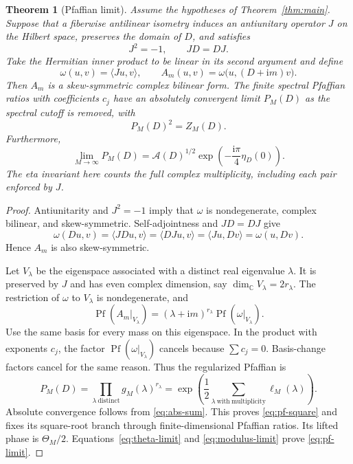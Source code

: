 \documentclass[11pt,a4paper]{article}
\newtheorem{theorem}{Theorem}[section]
\theoremstyle{remark}
\DeclareMathOperator{\Pf}{Pf}
\newcommand{\ii}{\mathrm i}
\newcommand{\C}{\mathbb C}
\numberwithin{equation}{section}
\begin{document}
\begin{theorem}[Pfaffian limit]\label{thm:pf}
Assume the hypotheses of Theorem~\ref{thm:main}. Suppose that a
fiberwise antilinear isometry induces an antiunitary operator $J$ on
the Hilbert space, preserves the domain of $D$, and satisfies
\begin{equation}\label{eq:J}
 J^2=-1,\qquad JD=DJ.
\end{equation}
Take the Hermitian inner product to be linear in its second argument
and define
\begin{equation}\label{eq:omega}
 \omega(u,v)=\langle Ju,v\rangle,
 \qquad A_m(u,v)=\omega\bigl(u,(D+\ii m)v\bigr).
\end{equation}
Then $A_m$ is a skew-symmetric complex bilinear form. The finite
spectral Pfaffian ratios with coefficients $c_j$ have an absolutely
convergent limit $P_M(D)$ as the spectral cutoff is removed, with
\begin{equation}\label{eq:pf-square}
 P_M(D)^2=Z_M(D).
\end{equation}
Furthermore,
\begin{equation}\label{eq:pf-limit}
 \lim_{M\to\infty}P_M(D)
 =\mathcal A(D)^{1/2}
       \exp\!\left(-\frac{\ii\pi}{4}\eta_D(0)\right).
\end{equation}
The eta invariant here counts the full complex multiplicity,
including each pair enforced by $J$.
\end{theorem}

\begin{proof}
Antiunitarity and $J^2=-1$ imply that $\omega$ is nondegenerate,
complex bilinear, and skew-symmetric. Self-adjointness and
$JD=DJ$ give
\begin{equation}\label{eq:omega-D}
 \omega(Du,v)=\langle JDu,v\rangle
 =\langle DJu,v\rangle=\langle Ju,Dv\rangle=\omega(u,Dv).
\end{equation}
Hence $A_m$ is also skew-symmetric.

Let $V_\lambda$ be the eigenspace associated with a distinct real
eigenvalue $\lambda$. It is preserved by $J$ and has even complex
dimension, say $\dim_\C V_\lambda=2r_\lambda$.
The restriction of $\omega$ to $V_\lambda$ is nondegenerate, and
\begin{equation}\label{eq:pf-eigenspace}
 \Pf(A_m|_{V_\lambda})
 =(\lambda+\ii m)^{r_\lambda}\Pf(\omega|_{V_\lambda}).
\end{equation}
Use the same basis for every mass on this eigenspace. In the product
with exponents $c_j$, the factor $\Pf(\omega|_{V_\lambda})$ cancels
because $\sum c_j=0$. Basis-change factors cancel for the same reason.
Thus the regularized Pfaffian is
\begin{equation}\label{eq:pf-product}
 P_M(D)=\prod_{\lambda\ \mathrm{distinct}}g_M(\lambda)^{r_\lambda}
 =\exp\!\left(\frac12\sum_{\lambda\ \mathrm{with\ multiplicity}}
                         \ell_M(\lambda)\right).
\end{equation}
Absolute convergence follows from \eqref{eq:abs-sum}.
This proves \eqref{eq:pf-square} and fixes its square-root branch
through finite-dimensional Pfaffian ratios. Its lifted phase is
$\Theta_M/2$. Equations~\eqref{eq:theta-limit} and
\eqref{eq:modulus-limit} prove \eqref{eq:pf-limit}.
\end{proof}
\end{document}
